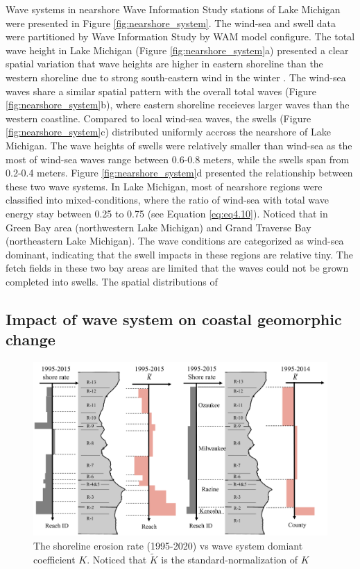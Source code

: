 Wave systems in nearshore Wave Information Study stations of Lake Michigan were
presented in Figure \ref{fig:nearshore_system}. The wind-sea and swell data were
partitioned by Wave Information Study by WAM model configure. The total wave
height in Lake Michigan (Figure \ref{fig:nearshore_system}a) presented a clear
spatial variation that wave heights are higher in eastern shoreline than the
western shoreline due to strong south-eastern wind in the winter
\citep{huang_wave_2021}. The wind-sea waves share a similar spatial pattern with
the overall total waves (Figure \ref{fig:nearshore_system}b), where eastern
shoreline receieves larger waves than the western coastline. Compared to local
wind-sea waves, the swells (Figure \ref{fig:nearshore_system}c) distributed
uniformly accross the nearshore of Lake Michigan. The wave heights of swells
were relatively smaller than wind-sea as the most of wind-sea waves range
between 0.6-0.8 meters, while the swells span from 0.2-0.4 meters. Figure
\ref{fig:nearshore_system}d presented the relationship between these two wave
systems. In Lake Michigan, most of nearshore regions were classified into
mixed-conditions, where the ratio of wind-sea with total wave energy stay
between 0.25 to 0.75 (see Equation \ref{eq:eq4.10}). Noticed that in Green Bay
area (northwestern Lake Michigan) and Grand Traverse Bay (northeastern Lake
Michigan). The wave conditions are categorized as wind-sea dominant, indicating
that the swell impacts in these regions are relative tiny. The fetch fields in
these two bay areas are limited that the waves could not be grown completed into
swells. The spatial distributions of 

\subsection{Impact of wave system on coastal geomorphic change}
\label{Impact of wave system on coastal geomorphic change}

\begin{figure}[htbp]
  \centering
  \includegraphics[width=1\textwidth]{chapter4/resources/nearshore_correlation.png}
  \caption{The shoreline erosion rate (1995-2020) vs wave system domiant
  coefficient $K$. Noticed that $\widetilde{K}$ is the standard-normalization of
  $K$ }
  \label{fig:nearshore_cor}
\end{figure}


